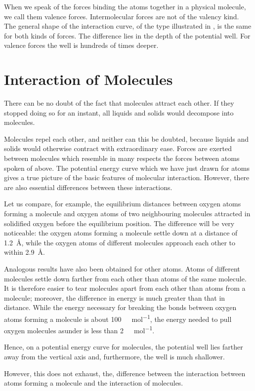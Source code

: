 When we speak of the forces binding the atoms together in a physical molecule, we call them valence forces. Intermolecular forces are not of the valency kind. The general shape of the interaction curve, of the type il­lustrated in , is the same for both kinds of forces. The difference lies in the depth of the potential well. For valence forces the well is hundreds of times deeper.


\section{Interaction of Molecules}
There can be no doubt of the fact that molecules at­tract each other. If they stopped doing so for an instant, all liquids and solids would decompose into molecules.

Molecules repel each other, and neither can this be doubted, because liquids and solids would otherwise contract with extraordinary ease.
Forces are exerted between molecules which resemble in many respects the forces between atoms spoken of above. The potential energy curve which we have just drawn for atoms gives a true picture of the basic features of molecular interaction. However, there are also es­sential differences between these interactions.

Let us compare, for example, the equilibrium distances between oxygen atoms forming a molecule and oxygen atoms of two neighbouring molecules attracted in solidified oxygen before the equilibrium position. The difference will be very noticeable: the oxygen atoms forming a molecule settle down at a distance of \SI{1.2}{\angstrom}, while the oxygen atoms of different molecules approach each other to within \SI{2.9}{\angstrom}.

Analogous results have also been obtained for other atoms. Atoms of different molecules settle down farther from each other than atoms of the same molecule. It is therefore easier to tear molecules apart from each other than atoms from a molecule; moreover, the difference in energy is much greater than that in distance. While the energy necessary for breaking the bonds between oxygen atoms forming a molecule is about \SI{100}{\kilo\calorie\per\mole}, the energy needed to pull oxygen molecules asunder is less than \SI{2}{\kilo\calorie\per\mole}.

Hence, on a potential energy curve for molecules, the potential well lies farther away from the vertical axis and, furthermore, the well is much shallower.

However, this does not exhaust, the, difference between the interaction between atoms forming a molecule and the interaction of molecules.

